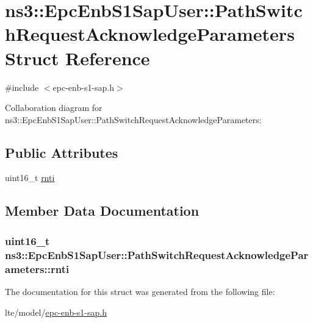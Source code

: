\hypertarget{structns3_1_1EpcEnbS1SapUser_1_1PathSwitchRequestAcknowledgeParameters}{}\section{ns3\+:\+:Epc\+Enb\+S1\+Sap\+User\+:\+:Path\+Switch\+Request\+Acknowledge\+Parameters Struct Reference}
\label{structns3_1_1EpcEnbS1SapUser_1_1PathSwitchRequestAcknowledgeParameters}


{\ttfamily \#include $<$epc-\/enb-\/s1-\/sap.\+h$>$}



Collaboration diagram for ns3\+:\+:Epc\+Enb\+S1\+Sap\+User\+:\+:Path\+Switch\+Request\+Acknowledge\+Parameters\+:
\subsection*{Public Attributes}
\begin{DoxyCompactItemize}
\item 
uint16\+\_\+t \hyperlink{structns3_1_1EpcEnbS1SapUser_1_1PathSwitchRequestAcknowledgeParameters_a2b68e8e1a3460871834c9688a01989a7}{rnti}
\end{DoxyCompactItemize}


\subsection{Member Data Documentation}
\subsubsection[{\texorpdfstring{rnti}{rnti}}]{\setlength{\rightskip}{0pt plus 5cm}uint16\+\_\+t ns3\+::\+Epc\+Enb\+S1\+Sap\+User\+::\+Path\+Switch\+Request\+Acknowledge\+Parameters\+::rnti}\hypertarget{structns3_1_1EpcEnbS1SapUser_1_1PathSwitchRequestAcknowledgeParameters_a2b68e8e1a3460871834c9688a01989a7}{}\label{structns3_1_1EpcEnbS1SapUser_1_1PathSwitchRequestAcknowledgeParameters_a2b68e8e1a3460871834c9688a01989a7}


The documentation for this struct was generated from the following file\+:\begin{DoxyCompactItemize}
\item 
lte/model/\hyperlink{epc-enb-s1-sap_8h}{epc-\/enb-\/s1-\/sap.\+h}\end{DoxyCompactItemize}
